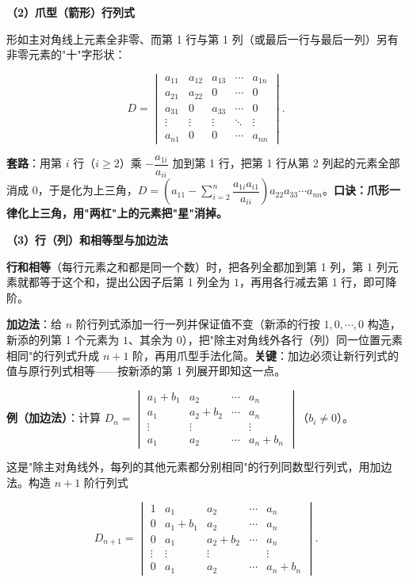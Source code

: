 \documentclass[11pt,openany,UTF8]{ctexbook}
\begin{document}
\textbf{（2）爪型（箭形）行列式}

形如主对角线上元素全非零、而第 1 行与第 1 列（或最后一行与最后一列）另有非零元素的"十"字形状：

\[D=\begin{vmatrix}a_{11}&a_{12}&a_{13}&\cdots&a_{1n}\\a_{21}&a_{22}&0&\cdots&0\\a_{31}&0&a_{33}&\cdots&0\\\vdots&\vdots&\vdots&\ddots&\vdots\\a_{n1}&0&0&\cdots&a_{nn}\end{vmatrix}.\]

\textbf{套路}：用第 $i$ 行（$i\ge2$）乘 $-\dfrac{a_{1i}}{a_{ii}}$ 加到第 1 行，把第 1 行从第 2 列起的元素全部消成 $0$，于是化为上三角，$D=\left(a_{11}-\sum_{i=2}^{n}\dfrac{a_{1i}a_{i1}}{a_{ii}}\right)a_{22}a_{33}\cdots a_{nn}$。\textbf{口诀：爪形一律化上三角，用"两杠"上的元素把"星"消掉。}

\textbf{（3）行（列）和相等型与加边法}

\textbf{行和相等}（每行元素之和都是同一个数）时，把各列全都加到第 1 列，第 1 列元素就都等于这个和，提出公因子后第 1 列全为 $1$，再用各行减去第 1 行，即可降阶。

\textbf{加边法}：给 $n$ 阶行列式添加一行一列并保证值不变（新添的行按 $1,0,\cdots,0$ 构造，新添的列第 1 个元素为 $1$、其余为 $0$），把"除主对角线外各行（列）同一位置元素相同"的行列式升成 $n+1$ 阶，再用爪型手法化简。\textbf{关键}：加边必须让新行列式的值与原行列式相等——按新添的第 1 列展开即知这一点。

\textbf{例（加边法）}：计算 $D_n=\begin{vmatrix}a_1+b_1&a_2&\cdots&a_n\\a_1&a_2+b_2&\cdots&a_n\\\vdots&\vdots&&\vdots\\a_1&a_2&\cdots&a_n+b_n\end{vmatrix}$（$b_i\ne0$）。

这是"除主对角线外，每列的其他元素都分别相同"的行列同数型行列式，用加边法。构造 $n+1$ 阶行列式

\[D_{n+1}=\begin{vmatrix}1&a_1&a_2&\cdots&a_n\\0&a_1+b_1&a_2&\cdots&a_n\\0&a_1&a_2+b_2&\cdots&a_n\\\vdots&\vdots&\vdots&&\vdots\\0&a_1&a_2&\cdots&a_n+b_n\end{vmatrix}.\]
\end{document}
